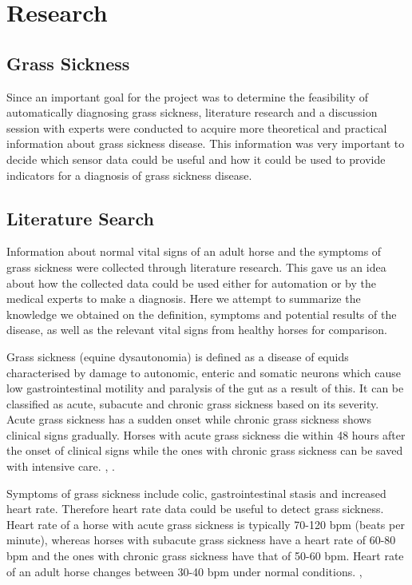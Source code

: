 \chapter{Research}
\label{chap:research}

\section{Grass Sickness}
Since an important goal for the project was to determine the feasibility of automatically diagnosing grass sickness, literature research and a discussion session with experts were conducted to acquire more theoretical and practical information about grass sickness disease. This information was very important to decide which sensor data could be useful and how it could be used to provide indicators for a diagnosis of grass sickness disease.  


\section{Literature Search}
Information about normal vital signs of an adult horse and the symptoms of grass sickness were collected through literature research. This gave us an idea about how the collected data could be used either for automation or by the medical experts to make a diagnosis. Here we attempt to summarize the knowledge we obtained on the definition, symptoms and potential results of the disease, as well as the relevant vital signs from healthy horses for comparison.

Grass sickness (equine dysautonomia) is defined as a disease of equids characterised by damage to autonomic, enteric and somatic neurons which cause low gastrointestinal motility and paralysis of the gut as a result of this. It can be classified as acute, subacute and chronic grass sickness based on its severity. Acute grass sickness has a sudden onset while chronic grass sickness shows clinical signs gradually. Horses with acute grass sickness die within 48 hours after the onset of clinical signs while the ones with chronic grass sickness can be saved with intensive care. \cite{robinson2009current}, \cite{edwards2010edaphic}.

Symptoms of grass sickness include colic, gastrointestinal stasis and increased heart rate. Therefore heart rate data could be useful to detect grass sickness. Heart rate of a horse with acute grass sickness is typically 70-120 bpm (beats per minute), whereas horses with subacute grass sickness have a heart rate of 60-80 bpm and the ones with chronic grass sickness have that of 50-60 bpm. Heart rate of an adult horse changes between 30-40 bpm under normal conditions. \cite{corley2009equine}, \cite{robinson2009current}

